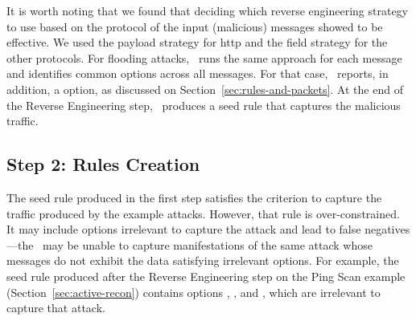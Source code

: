 \documentclass[conference]{IEEEtran}
\begin{document}

It is worth noting that we found that deciding which reverse
engineering strategy to use based on the protocol of the input
(malicious) messages showed to be effective. We used the payload
strategy for http and the field strategy for the other protocols. For
flooding attacks, \tname\ runs the same approach for each message and
identifies common options across all messages. For that case,
\tname\ reports, in addition, a  option, as
discussed on Section~\ref{sec:rules-and-packets}.  At the end of the
Reverse Engineering step, \tname\ produces a seed rule that captures
the malicious traffic.





\subsection{Step 2: Rules Creation}
\label{sec:minimization}

The seed rule produced in the first step satisfies the criterion to
capture the traffic produced by the example attacks. However, that
rule is over-constrained.  It may include options irrelevant to
capture the attack and lead to false negatives---the \nids\ may be
unable to capture manifestations of the same attack whose messages do
not exhibit the data satisfying irrelevant options. For example, the
seed rule produced after the Reverse Engineering step on the Ping Scan
example (Section~\ref{sec:active-recon}) contains options
, , and
, which are irrelevant to capture that attack.
\end{document}
